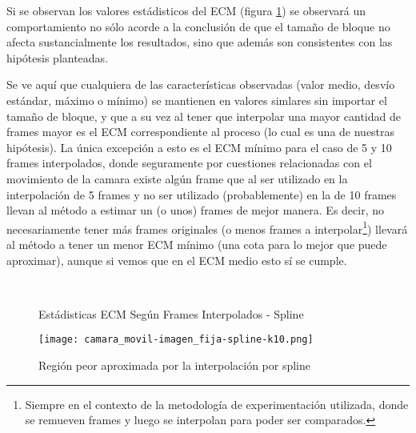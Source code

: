 \par Si se observan los valores est\'adisticos del ECM (figura
\ref{fig:movil-fija_spline-mse_estadisticas}) se observar\'a un comportamiento
no s\'olo acorde a la conclusi\'on de que el tama\~no de bloque no afecta
sustancialmente los resultados, sino que adem\'as son consistentes con las
hip\'otesis planteadas.

\par Se ve aqu\'i que cualquiera de las caracter\'isticas observadas (valor
medio, desv\'io est\'andar, m\'aximo o m\'inimo) se mantienen en valores
simlares sin importar el tama\~no de bloque, y que a su vez al tener que
interpolar una mayor cantidad de frames mayor es el ECM correspondiente al
proceso (lo cual es una de nuestras hip\'otesis). La \'unica excepci\'on a esto
es el ECM m\'inimo para el caso de 5 y 10 frames interpolados, donde
seguramente por cuestiones relacionadas con el movimiento de la camara existe
alg\'un frame que al ser utilizado en la interpolaci\'on de 5 frames y no ser
utilizado (probablemente) en la de 10 frames llevan al m\'etodo a estimar un (o
unos) frames de mejor manera. Es decir, no necesariamente tener m\'as frames
originales (o menos frames a interpolar\footnote{Siempre en el contexto de la
metodolog\'ia de experimentaci\'on utilizada, donde se remueven frames y luego
se interpolan para poder ser comparados.}) llevar\'a al m\'etodo a tener un
menor ECM m\'inimo (una cota para lo mejor que puede aproximar), aunque si
vemos que en el ECM medio esto s\'i se cumple.

\begin{figure}[H]
    \centering
    \\
    \caption{Est\'adisticas ECM Seg\'un Frames Interpolados - Spline}
    \label{fig:movil-fija_spline-mse_estadisticas}
\end{figure}

\begin{figure}[H]
    \centering
    \texttt{[image: camara\_movil-imagen\_fija-spline-k10.png]}
    \label{fig:movil-fija_spline-heatmap}
    \caption{Regi\'on peor aproximada por la interpolaci\'on por spline}
\end{figure}

